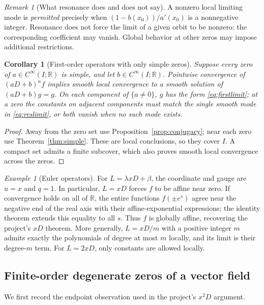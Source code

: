 \documentclass[11pt,reqno]{amsart}
\numberwithin{equation}{section}
\newtheorem{corollary}[theorem]{Corollary}
\theoremstyle{definition}
\theoremstyle{remark}
\newtheorem{remark}[theorem]{Remark}
\newtheorem{example}[theorem]{Example}
\newcommand{\R}{\mathbb R}
\begin{document}
\begin{remark}[What resonance does and does not say]
A nonzero local limiting mode is \emph{permitted} precisely when $(1-b(x_0))/a'(x_0)$ is a nonnegative integer. Resonance does not force the limit of a given orbit to be nonzero: the corresponding coefficient may vanish. Global behavior at other zeros may impose additional restrictions.
\end{remark}

\begin{corollary}[First-order operators with only simple zeros]\label{cor:globalsimple}
Suppose every zero of $a\in C^\infty(I;\R)$ is simple, and let $b\in C^\infty(I;\R)$. Pointwise convergence of $(aD+b)^nf$ implies smooth local convergence to a smooth solution of $(aD+b)g=g$. On each component of $\{a\ne0\}$, $g$ has the form \eqref{eq:firstlimit}; at a zero the constants on adjacent components must match the single smooth mode in \eqref{eq:reslimit}, or both vanish when no such mode exists.
\end{corollary}
\begin{proof}
Away from the zero set use Proposition~\ref{prop:conjugacy}; near each zero use Theorem~\ref{thm:simple}. These are local conclusions, so they cover $I$. A compact set admits a finite subcover, which also proves smooth local convergence across the zeros.
\end{proof}

\begin{example}[Euler operators]
For $L=\lambda xD+\beta$, the coordinate and gauge are $u=x$ and $q=1$. In particular, $L=xD$ forces $f$ to be affine near zero. If convergence holds on all of $\R$, the entire functions $f(\pm e^s)$ agree near the negative end of the real axis with their affine-exponential expressions; the identity theorem extends this equality to all $s$. Thus $f$ is globally affine, recovering the project's $xD$ theorem. More generally, $L=xD/m$ with a positive integer $m$ admits exactly the polynomials of degree at most $m$ locally, and its limit is their degree-$m$ term. For $L=2xD$, only constants are allowed locally.
\end{example}

\subsection{Finite-order degenerate zeros of a vector field}
We first record the endpoint observation used in the project's $x^2D$ argument.
\end{document}
